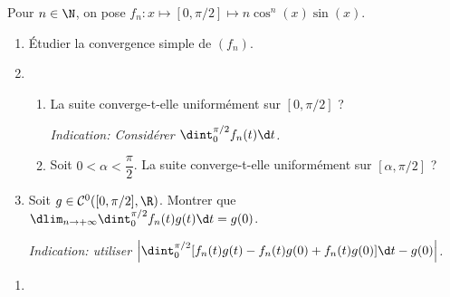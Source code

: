 \begin{enonce}
\begin{exercise}[ID={RMS134 E1489},subtitle={CCINP MP 2023},theme={analyse},concours={ccinp},annee={2023},filiere={MP}, difficulty={0}]
  Pour $n\in\N$, on pose $f_n:x\mapsto[0,\pi/2]\mapsto n\cos^n(x)\sin(x)$.
 \begin{enumerate}
  \item Étudier la convergence simple de $(f_n)$.
  \item
    \begin{enumerate}
    \item La suite converge-t-elle uniformément sur $[0,\pi/2]$ ?
      
      {\itshape Indication: Considérer $\dint_0^{\pi/2}f_n(t)\d t$.}
    \item Soit $0<\alpha<\dfrac{\pi}2$. La suite converge-t-elle
      uniformément sur $[\alpha,\pi/2]$ ?
    \end{enumerate}
  \item Soit $g\in\mathcal{C}^0([0,\pi/2],\R)$. Montrer que
    $\dlim_{n\to +\infty}\dint_0^{\pi/2} f_n(t)g(t)\d t=g(0)$.

    {\itshape Indication: utiliser
      $\left|\dint_0^{\pi/2}[f_n(t)g(t)-f_n(t)g(0)+f_n(t)g(0)]
        \d t-g(0)\right|$.}
  \end{enumerate}
\end{exercise}
\begin{solution}
  \begin{enumerate}
  \item 
  \end{enumerate}
\end{solution}
\end{enonce}